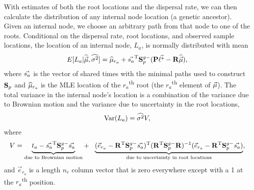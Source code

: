 With estimates of both the root locations and the dispersal rate, we can then calculate the distribution of any internal node location (a genetic ancestor). Given an internal node, we choose an arbitrary path from that node to one of the roots. Conditional on the dispersal rate, root locations, and observed sample locations, the location of an internal node, $L_a$, is normally distributed with mean
\begin{eqnarray}\label{eq:Lint}
    E[L_a | \widehat{\vec{\mu}}, \widehat{\sigma^2}] =  \widehat{\mu}_{r_a} + \vec{s_a}^\text{T}\mathbf{S}_p^{g-}(\mathbf{P}\vec{\ell^*} - \mathbf{R} \widehat{\vec{\mu}}),
\end{eqnarray} 
where $\vec{s_a}$ is the vector of shared times with the minimal paths used to construct $\mathbf{S}_p$ and $\widehat{\mu}_{r_a}$ is the MLE location of the $r_a$\textsuperscript{th} root (the $r_a$\textsuperscript{th} element of $\vec{\mu}$). 
The total variance in the internal node's location is a combination of the variance due to Brownian motion and the variance due to uncertainty in the root locations,
\begin{eqnarray}\label{eq:VarLint}
    \operatorname{\text{Var}} (L_a) = \widehat{\sigma^2} V,
\end{eqnarray}
where
\begin{eqnarray}\label{eq:ancestor_specifc_uncertainty}
    V = \underbrace{t_a - \vec{s_a}^\text{T}\mathbf{S}_p^{g-}\vec{s_a}}_{\text{due to Brownian motion}} + \ \ \underbrace{(\vec{e}_{r_a} - \mathbf{R}^\text{T}\mathbf{S}_p^{g-}\vec{s_a})^\text{T} ( \mathbf{R}^\text{T}\mathbf{S}_p^{g-}\mathbf{R} )^{-1} (\vec{e}_{r_a} - \mathbf{R}^\text{T}\mathbf{S}_p^{g-}\vec{s_a})}_{\text{due to uncertainty in root locations}}, 
\end{eqnarray}
and $\vec{e}_{r_a}$ is a length $n_r$ column vector that is zero everywhere except with a 1 at the $r_a$\textsuperscript{th} position. 


